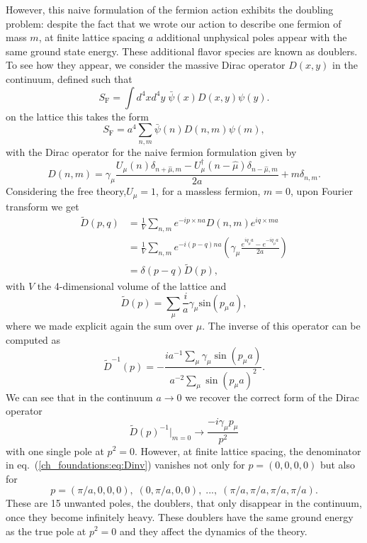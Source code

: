 However, this naive formulation of the fermion action exhibits the doubling problem: despite the fact that we wrote our action to describe one fermion of mass $m$, at finite lattice spacing $a$ additional unphysical poles appear with the same ground state energy. These additional flavor species are known as doublers. To see how they appear, we consider the massive Dirac operator $D(x,y)$ in the continuum, defined such that
\begin{equation}
S_{\textrm{F}}=\int d^4xd^4y\;\bar{\psi}(x)D(x,y)\psi(y).
\end{equation}
on the lattice this takes the form
\begin{equation}
S_{\textrm{F}}=a^4\sum_{n,m}\bar{\psi}(n)D(n,m)\psi(m),
\end{equation}
with the Dirac operator for the naive fermion formulation given by
\begin{equation}
D(n,m)=\gamma_{\mu}\frac{U_{\mu}(n)\delta_{n+\hat{\mu},m}-U_{\mu}^{\dagger}(n-\hat{\mu})\delta_{n-\hat{\mu},m}}{2a}+m\delta_{n,m}.
\end{equation}
Considering the free theory,$U_{\mu}=1$, for a massless fermion, $m=0$, upon Fourier transform we get
\begin{align}
\tilde{D}(p,q)&=\frac{1}{V}\sum_{n,m}e^{-ip\times na}D(n,m)e^{iq\times ma}\\
&=\frac{1}{V}\sum_{n,m}e^{-i(p-q)na}\left(\gamma_{\mu}\frac{e^{iq_{\mu}a}-e^{-iq_{\mu}a}}{2a}\right)\\
&=\delta(p-q)\tilde{D}(p),
\end{align}
with $V$ the 4-dimensional volume of the lattice and
\begin{equation}
\tilde{D}(p)=\sum_{\mu}\frac{i}{a}\gamma_{\mu}\textrm{sin}(p_{\mu}a),
\end{equation}
where we made explicit again the sum over $\mu$. The inverse of this operator can be computed as
\begin{equation}
\label{ch_foundations:eq:Dinv}
\tilde{D}^{-1}(p)=-\frac{ia^{-1}\sum_{\mu}\gamma_{\mu}\sin(p_{\mu}a)}{a^{-2}\sum_{\mu}\sin(p_{\mu}a)^2}.
\end{equation}
We can see that in the continuum $a\rightarrow0$ we recover the correct form of the Dirac operator
\begin{equation}
\tilde{D}(p)^{-1}|_{m=0}\rightarrow\frac{-i\gamma_{\mu}p_{\mu}}{p^2}
\end{equation}
with one single pole at $p^2=0$. However, at finite lattice spacing, the denominator in eq.~(\ref{ch_foundations:eq:Dinv}) vanishes not only for $p=(0,0,0,0)$ but also for 
\begin{equation}
p=(\pi/a,0,0,0),\;(0,\pi/a,0,0),\;...,\;(\pi/a,\pi/a,\pi/a,\pi/a).
\end{equation}
These are 15 unwanted poles, the doublers, that only disappear in the continuum, once they become infinitely heavy. These doublers have the same ground energy as the true pole at $p^2=0$ and they affect the dynamics of the theory. 

